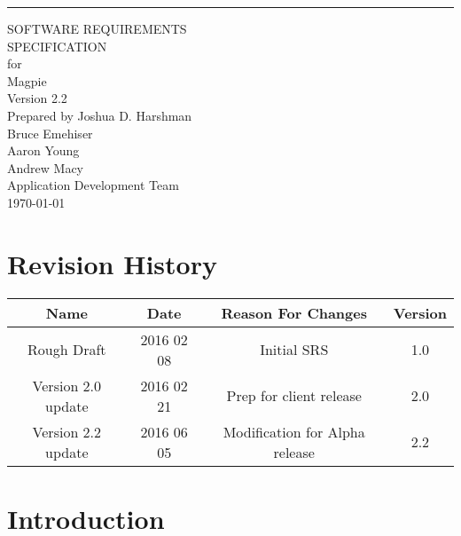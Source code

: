 \documentclass{scrreprt}
\date{}
\def\myversion{2.2 }
\begin{document}
\begin{flushright}
    \rule{16cm}{5pt}\vskip1cm
    \begin{bfseries}
        \Huge{SOFTWARE REQUIREMENTS\\ SPECIFICATION}\\
        \vspace{1.9cm}
        for\\
        \vspace{1.9cm}
        Magpie\\
        \vspace{1.9cm}
        \LARGE{Version \myversion}\\
        \vspace{1.9cm}
        Prepared by Joshua D. Harshman\\Bruce Emehiser\\Aaron Young\\Andrew Macy\\
        \vspace{1.9cm}
        Application Development Team\\
        \vspace{1.9cm}
        \today\\
    \end{bfseries}
\end{flushright}

\tableofcontents

\chapter*{Revision History}

\begin{center}
    \begin{tabular}{|c|c|c|c|}
        \hline
	    Name & Date & Reason For Changes & Version \\
        \hline
	    Rough Draft & 2016 02 08 & Initial SRS & 1.0 \\
        \hline
        Version 2.0 update & 2016 02 21 & Prep for client release & 2.0 \\
        \hline
        Version 2.2 update & 2016 06 05 & Modification for Alpha release & 2.2 \\
        \hline
    \end{tabular}
\end{center}

\chapter{Introduction}
\end{document}
